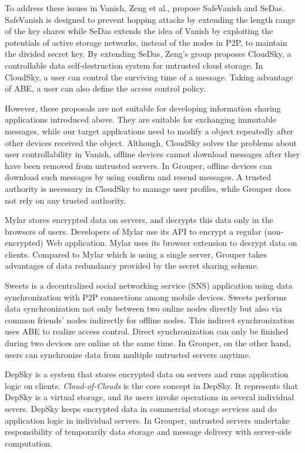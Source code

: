 \documentclass[twocolumn,10pt]{article}
\begin{document}
To address these issues in Vanish, Zeng et al., propose SafeVanish\cite{zeng2010safevanish} and SeDas\cite{zeng2012sedas}. 
SafeVanish is designed to prevent hopping attacks by extending the length range of the key shares while SeDas extends the idea of Vanish by exploiting the potentials of active storage networks, instead of the nodes in P2P, to maintain the divided secret key. By extending SeDas, Zeng's group proposes CloudSky\cite{zeng2015cloudsky}, a controllable data self-destruction system for untrusted cloud storage. 
In CloudSky, a user can control the surviving time of a message.
Taking advantage of ABE, a user can also define the access control policy.

However, these proposals are not suitable for developing information sharing applications introduced above. 
They are suitable for exchanging immutable messages, while our target applications need to modify a object repeatedly after other devices received the object. 
Although, CloudSky solves the problems about user controllability in Vanish, offline devices cannot download messages after they have been removed from untrusted servers.
In Grouper, offline devices can download such messages by using confirm and resend messages.
A trusted authority is necessary in CloudSky to manage user profiles, while Grouper does not rely on any trusted authority.

Mylar\cite{popa2014building} stores encrypted data on servers, and decrypts this data only in the browsers of users. 
Developers of Mylar use its API to encrypt a regular (non-encrypted) Web application. 
Mylar uses its browser extension to decrypt data on clients. 
Compared to Mylar which is using a single server, Grouper takes advantages of data redundancy provided by the secret sharing scheme.

Sweets\cite{sweets} is a decentralized social networking service (SNS) application using data synchronization with P2P connections among mobile devices. 
Sweets performs data synchronization not only between two online nodes directly but also via common friends' nodes indirectly for offline nodes.
This indirect synchronization uses ABE to realize access control.
Direct synchronization can only be finished during two devices are online at the same time. 
In Grouper, on the other hand, users can synchronize data from multiple untrusted servers anytime.

DepSky\cite{bessani2013depsky} is a system that stores encrypted data on servers and runs application logic on clients.
\emph{Cloud-of-Clouds} is the core concept in DepSky. 
It represents that DepSky is a virtual storage, and its users invoke operations in several individual severs. 
DepSky keeps encrypted data in commercial storage services and do application logic in individual servers.
In Grouper, untrusted servers undertake responsibility of temporarily data storage and message delivery with server-side computation.
\end{document}
